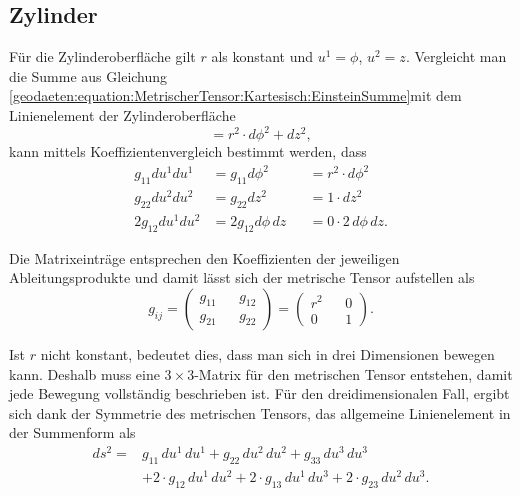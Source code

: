 %
%
%
%
\subsection{Zylinder\label{geodaeten:section:MetrischerTensor:Zylinder}}

Für die Zylinderoberfläche gilt $r$ als konstant und $u^1 = \phi$, $u^2 =z$.
Vergleicht man die Summe aus Gleichung \eqref{geodaeten:equation:MetrischerTensor:Kartesisch:EinsteinSumme}mit dem Linienelement der Zylinderoberfläche
\begin{equation}
	= r^2 \cdot d \phi^2 +dz^2 ,
\end{equation}
kann mittels Koeffizientenvergleich bestimmt werden, dass
\begin{equation}
	\begin{alignedat}{3}
		g_{11}  du^1 du^1 &= g_{11}  d \phi^2 & &= r^2 \cdot d \phi^2 \\
		g_{22}  du^2 du^2 &= g_{22}  dz^2    & &= 1 \cdot dz^2 \\
		2g_{12}  du^1 du^2 &= 2g_{12}  d \phi \, dz & &= 0 \cdot 2 \, d \phi \,  dz.
	\end{alignedat}
\end{equation}

Die Matrixeinträge entsprechen den Koeffizienten der jeweiligen Ableitungsprodukte und damit lässt sich der metrische Tensor aufstellen als
\begin{equation}
	g_{ij} =\begin{pmatrix} g_{11} && g_{12} \\ g_{21} && g_{22} \end{pmatrix}= \begin{pmatrix} r^2 && 0 \\ 0 && 1 \end{pmatrix} .
\end{equation}

Ist $r$ nicht konstant, bedeutet dies, dass man sich in drei Dimensionen bewegen kann.
Deshalb muss eine $3 \times 3$-Matrix für den metrischen Tensor entstehen, damit jede Bewegung vollständig beschrieben ist. 
Für den dreidimensionalen Fall, ergibt sich dank der Symmetrie des metrischen Tensors, das allgemeine Linienelement in der Summenform als
\begin{equation}
	\begin{aligned}
		ds^2 = &g_{11} \, du^1 \, du^1 + g_{22} \, du^2 \, du^2 + g_{33} \, du^3 \, du^3 \nonumber \\
		&+ 2 \cdot g_{12} \, du^1 \, du^2 + 2 \cdot g_{13} \, du^1 \, du^3 + 2 \cdot g_{23} \, du^2 \, du^3.
	\end{aligned}
	\label{geodaeten:equation:MetrischerTensor:Kartesisch:EinsteinSumme3D}
\end{equation}

